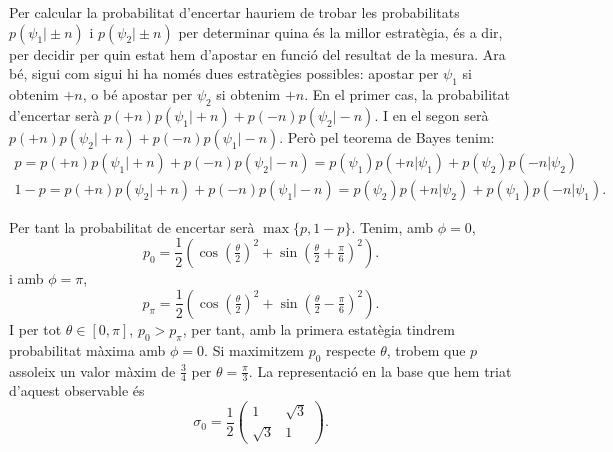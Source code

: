 \documentclass[12pt]{article}
\numberwithin{table}{section}
\numberwithin{figure}{section}
\numberwithin{equation}{section}
\begin{document}
Per calcular la probabilitat d'encertar hauriem de trobar les probabilitats \( p(\psi_1 \vert \pm n) \) i \( p(\psi_2 \vert \pm n) \) per determinar quina és la millor estratègia, és a dir, per decidir per quin estat hem d'apostar en funció del resultat de la mesura. Ara bé, sigui com sigui hi ha només dues estratègies possibles: apostar per \( \psi_1 \) si obtenim \( +n \), o bé apostar per \( \psi_2 \) si obtenim \( +n \). En el primer cas, la probabilitat d'encertar serà \( p(+n)p(\psi_1 \vert +n) + p(-n)p(\psi_2 \vert -n) \). I en el segon serà \( p(+n)p(\psi_2 \vert +n) + p(-n)p(\psi_1 \vert -n) \). Però pel teorema de Bayes tenim:
\begin{gather*}
	p = p(+n)p(\psi_1 \vert +n) + p(-n)p(\psi_2 \vert -n) = p(\psi_1)p(+n \vert \psi_1) + p(\psi_2)p(-n \vert \psi_2) \\
1 - p = p(+n)p(\psi_2 \vert +n) + p(-n)p(\psi_1 \vert -n) = p(\psi_2)p(+n \vert \psi_2) + p(\psi_1)p(-n \vert \psi_1).
\end{gather*}

Per tant la probabilitat de encertar serà \( \max{\{p, 1 - p\}} \). Tenim, amb \( \phi = 0 \),
\begin{equation*}
	p_0 = \frac{1}{2}\left(\cos{\left(\tfrac{\theta}{2}\right)}^2 + \sin{\left(\tfrac{\theta}{2} + \tfrac{\pi}{6}\right)}^2\right).
\end{equation*}
i amb \( \phi = \pi \),
\begin{equation*}
	p_\pi = \frac{1}{2}\left(\cos{\left(\tfrac{\theta}{2}\right)}^2 + \sin{\left(\tfrac{\theta}{2} - \tfrac{\pi}{6}\right)}^2\right).
\end{equation*}
I per tot \( \theta \in [0, \pi] \), \( p_0 > p_\pi \), per tant, amb la primera estatègia tindrem probabilitat màxima amb \( \phi = 0 \). Si maximitzem \( p_0 \) respecte \( \theta \), trobem que \( p \) assoleix un valor màxim de \( \frac{3}{4} \) per \( \theta = \frac{\pi}{3} \). La representació en la base que hem triat d'aquest observable és
\begin{equation*}
\sigma_0 = \frac{1}{2}\begin{pmatrix}
	1 & \sqrt{3} \\
	\sqrt{3} & 1
\end{pmatrix}.
\end{equation*}
\end{document}
